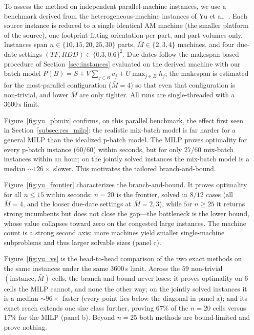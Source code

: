 \documentclass[review,3p,times,authoryear]{elsarticle}
\begin{document}
To assess the method on independent parallel-machine instances, we use a
benchmark derived from the heterogeneous-machine instances of Yu et
al.~\cite{yuMathematicalModelsMinimizing2022}. Each source instance is reduced to
a single identical AM machine (the smaller platform of the source), one
footprint-fitting orientation per part, and part volumes only. Instances span
$n\in\{10,15,20,25,30\}$ parts, $\bar M\in\{2,3,4\}$ machines, and four due-date
settings $(TF,RDD)\in\{0.3,0.6\}^2$. Due dates follow the makespan-based
procedure of Section~\ref{sec:instances} evaluated on the derived machine with our
batch model $P(B)=S+V\sum_{j\in B}v_j+U\max_{j\in B}h_j$; the makespan is
estimated for the
most-parallel configuration ($\bar M=4$) so that even that configuration is
non-trivial, and lower $\bar M$ are only tighter. All runs are single-threaded
with a $3600$\,s limit.

Figure~\ref{fig:yu_pbmix} confirms, on this parallel benchmark, the effect first
seen in Section~\ref{subsec:res_milp}: the realistic mix-batch model is far harder
for a general MILP than the idealized p-batch model. The MILP proves optimality
for every p-batch instance (60/60) within seconds, but for only $27/60$ mix-batch
instances within an hour; on the jointly solved instances the mix-batch model is a
median $\sim\!126\times$ slower. This motivates the tailored branch-and-bound.

Figure~\ref{fig:yu_frontier} characterizes the branch-and-bound. It proves
optimality for all $n\le 15$ within seconds; $n=20$ is the frontier, solved in
$8/12$ cases (all $\bar M=4$, and the looser due-date settings at $\bar M=2,3$),
while for $n\ge 25$ it returns strong incumbents but does not close the gap---the
bottleneck is the lower bound, whose value collapses toward zero on the congested
large instances. The machine count is a strong second axis: more machines yield
smaller single-machine subproblems and thus larger solvable sizes (panel c).

Figure~\ref{fig:yu_vs} is the head-to-head comparison of the two exact methods on
the same instances under the same $3600$\,s limit. Across the $59$ non-trivial
$(\text{instance},\bar M)$ cells, the branch-and-bound never loses: it proves
optimality on $6$ cells the MILP cannot, and none the other way; on the jointly
solved instances it is a median $\sim\!96\times$ faster (every point lies below the
diagonal in panel a); and its exact reach extends one size class further, proving
$67\%$ of the $n=20$ cells versus $17\%$ for the MILP (panel b). Beyond $n=25$
both methods are bound-limited and prove nothing.
\end{document}
